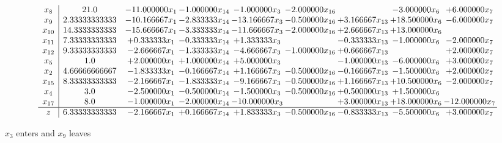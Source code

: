 \documentclass[10pt]{article}
\begin{document}
 \[\begin{array}{c| c c@{\hskip 2pt} c@{\hskip 2pt} c@{\hskip 2pt} c@{\hskip 2pt} c@{\hskip 2pt} c@{\hskip 2pt} c@{\hskip 2pt} }
 x_{8}   &  21.0 & -11.000000 x_{1} & -1.000000 x_{14} & -1.000000 x_{3} & -2.000000 x_{16} &   & -3.000000 x_{6} & + 6.000000 x_{7}\\
 x_{9}   &  2.33333333333 & -10.166667 x_{1} & -2.833333 x_{14} & -13.166667 x_{3} & -0.500000 x_{16} & + 3.166667 x_{13} & + 18.500000 x_{6} & -6.000000 x_{7}\\
 x_{10}   &  14.3333333333 & -15.666667 x_{1} & -3.333333 x_{14} & -11.666667 x_{3} & -2.000000 x_{16} & + 2.666667 x_{13} & + 13.000000 x_{6} &   \\
 x_{11}   &  7.33333333333 & + 0.333333 x_{1} & -0.333333 x_{14} & + 1.333333 x_{3} &   & -0.333333 x_{13} & -1.000000 x_{6} & -2.000000 x_{7}\\
 x_{12}   &  9.33333333333 & -2.666667 x_{1} & -1.333333 x_{14} & -4.666667 x_{3} & -1.000000 x_{16} & + 0.666667 x_{13} &   & + 2.000000 x_{7}\\
 x_{5}   &  1.0 & + 2.000000 x_{1} & + 1.000000 x_{14} & + 5.000000 x_{3} &   & -1.000000 x_{13} & -6.000000 x_{6} & + 3.000000 x_{7}\\
 x_{2}   &  4.66666666667 & -1.833333 x_{1} & -0.166667 x_{14} & + 1.166667 x_{3} & -0.500000 x_{16} & -0.166667 x_{13} & -1.500000 x_{6} & + 2.000000 x_{7}\\
 x_{15}   &  8.33333333333 & -2.166667 x_{1} & -1.833333 x_{14} & -9.166667 x_{3} & -0.500000 x_{16} & + 1.166667 x_{13} & + 10.500000 x_{6} & -2.000000 x_{7}\\
 x_{4}   &  3.0 & -2.500000 x_{1} & -0.500000 x_{14} & -1.500000 x_{3} & -0.500000 x_{16} & + 0.500000 x_{13} & + 1.500000 x_{6} &   \\
 x_{17}   &  8.0 & -1.000000 x_{1} & -2.000000 x_{14} & -10.000000 x_{3} &   & + 3.000000 x_{13} & + 18.000000 x_{6} & -12.000000 x_{7}\\
\hline
z    &  6.33333333333 & -2.166667 x_{1} & + 0.166667 x_{14} & + 1.833333 x_{3} & -0.500000 x_{16} & -0.833333 x_{13} & -5.500000 x_{6} & + 3.000000 x_{7}\\
\end{array}\]


 $ x_{3} $ enters and $ x_{9} $ leaves 
\end{document}
